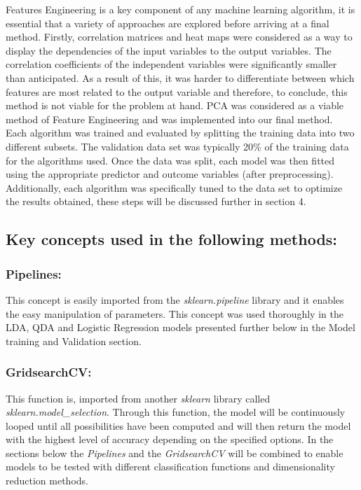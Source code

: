 \documentclass{article}
\begin{document}
Features Engineering is a key component of any machine learning algorithm, it is essential that a variety of approaches are explored before arriving at a final method. Firstly, correlation matrices and heat maps were considered as a way to display the dependencies of the input variables to the output variables. The correlation coefficients of the independent variables were significantly smaller than anticipated. As a result of this, it was harder to differentiate between which features are most related to the output variable and therefore, to conclude, this method is not viable for the problem at hand. PCA was considered as a viable method of Feature Engineering and was implemented into our final method. \\

Each algorithm was trained and evaluated by splitting the training data into two different subsets. The validation data set was typically 20\% of the training data for the algorithms used. Once the data was split, each model was then fitted using the appropriate predictor and outcome variables (after preprocessing). Additionally, each algorithm was specifically tuned to the data set to optimize the results obtained, these steps will be discussed further in section 4.

\subsection{Key concepts used in the following methods:}
\label{sec:key}
\subsubsection{Pipelines:}
This concept is easily imported from the \textit{sklearn.pipeline} library and it enables the easy manipulation of parameters. This concept was used thoroughly in the LDA, QDA and Logistic Regression models presented further below in the Model training and Validation section.
\subsubsection{GridsearchCV:}
This function is, imported from another \textit{sklearn} library called \textit{sklearn.model\_selection}. Through this function, the model will be continuously looped until all possibilities have been computed and will then return the model with the highest level of accuracy depending on the specified options. In the sections below the \textit{Pipelines} and the \textit{GridsearchCV} will be combined to enable models to be tested with different classification functions and dimensionality reduction methods.
\end{document}

